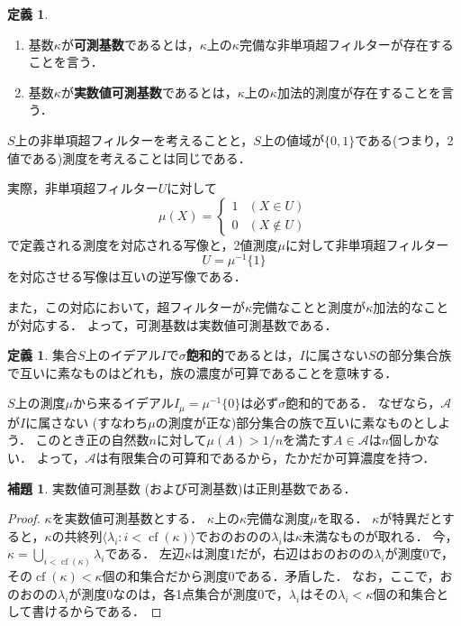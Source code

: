 \documentclass[uplatex]{jsarticle}
\newcommand{\cf}{\operatorname{cf}}
\newcommand{\seq}[1]{{\langle#1\rangle}}
\theoremstyle{definition}
\newtheorem{defi}[thm]{定義}
\newtheorem{lem}[thm]{補題}
\begin{document}
	\begin{defi}
		\begin{enumerate}
			\item 基数$\kappa$が\textbf{可測基数}であるとは，$\kappa$上の$\kappa$完備な非単項超フィルターが存在することを言う．
			\item 基数$\kappa$が\textbf{実数値可測基数}であるとは，$\kappa$上の$\kappa$加法的測度が存在することを言う．
		\end{enumerate}
	\end{defi}
	
	$S$上の非単項超フィルターを考えることと，$S$上の値域が$\{0, 1\}$である(つまり，2値である)測度を考えることは同じである．
	
	実際，非単項超フィルター$U$に対して
	\[\mu(X) = \begin{cases}1 & (X \in U)\\ 0 & (X \not \in U) \end{cases}\]
	で定義される測度を対応される写像と，2値測度$\mu$に対して非単項超フィルター
	\[U = \mu^{-1}\{1\}\]
	を対応させる写像は互いの逆写像である．
	
	また，この対応において，超フィルターが$\kappa$完備なことと測度が$\kappa$加法的なことが対応する．
	よって，可測基数は実数値可測基数である．
	
	\begin{defi}
		集合$S$上のイデアル$I$で\textbf{$\sigma$飽和的}であるとは，$I$に属さない$S$の部分集合族で互いに素なものはどれも，族の濃度が可算であることを意味する．
	\end{defi}
	
	$S$上の測度$\mu$から来るイデアル$I_\mu = \mu^{-1}\{0\}$は必ず$\sigma$飽和的である．
	なぜなら，$\mathcal{A}$が$I$に属さない (すなわち$\mu$の測度が正な)部分集合の族で互いに素なものとしよう．
	このとき正の自然数$n$に対して$\mu(A) > 1/n$を満たす$A \in \mathcal{A}$は$n$個しかない．
	よって，$\mathcal{A}$は有限集合の可算和であるから，たかだか可算濃度を持つ．
	
	\begin{lem}\label{lem:measisreg}
		実数値可測基数 (および可測基数)は正則基数である．
	\end{lem}
	\begin{proof}
		$\kappa$を実数値可測基数とする．
		$\kappa$上の$\kappa$完備な測度$\mu$を取る．
		$\kappa$が特異だとすると，$\kappa$の共終列$\seq{\lambda_i : i < \cf(\kappa) }$でおのおのの$\lambda_i$は$\kappa$未満なものが取れる．
		今，$\kappa = \bigcup_{i < \cf(\kappa)} \lambda_i$である．
		左辺$\kappa$は測度$1$だが，右辺はおのおのの$\lambda_i$が測度$0$で，その$\cf(\kappa) < \kappa$個の和集合だから測度$0$である．矛盾した．
		なお，ここで，おのおのの$\lambda_i$が測度$0$なのは，各1点集合が測度$0$で，$\lambda_i$はその$\lambda_i < \kappa$個の和集合として書けるからである．
	\end{proof}
\end{document}
